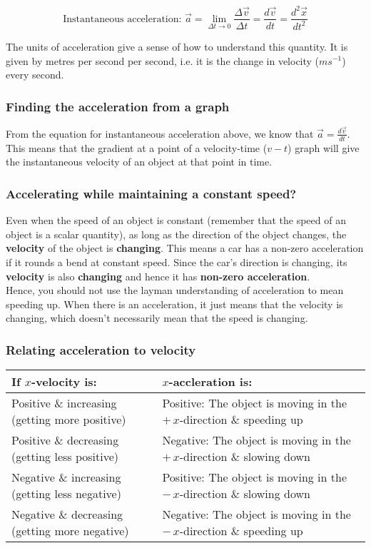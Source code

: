 \documentclass[11pt]{article}
\begin{document}
\[\text{Instantaneous acceleration: } \vec{a} = \lim_{\Delta t \rightarrow 0} \frac{\Delta \vec{v}}{\Delta t} = \frac{d \vec{v}}{dt} = \frac{d^2 \vec{x}}{dt^2}\]

The units of acceleration give a sense of how to understand this quantity. It is given by metres per second per second, i.e. it is the change in velocity (\(\si{ms^{-1}}\)) every second.

\subsubsection{Finding the acceleration from a graph}
\label{sec:org63b3367}
From the equation for instantaneous acceleration above, we know that \(\vec{a} = \frac{d \vec{v}}{dt}\). This means that the gradient at a point of a velocity-time (\(v - t\)) graph will give the instantaneous velocity of an object at that point in time.

\subsubsection{Accelerating while maintaining a constant speed?}
\label{sec:orga23889c}
Even when the speed of an object is constant (remember that the speed of an object is a scalar quantity), as long as the direction of the object changes, the \textbf{velocity} of the object is \textbf{changing}. This means a car has a non-zero acceleration if it rounds a bend at constant speed. Since the car's direction is changing, its \textbf{velocity} is also \textbf{changing} and hence it has \textbf{non-zero acceleration}.
\\[0pt]

Hence, you should not use the layman understanding of acceleration to mean speeding up. When there is an acceleration, it just means that the velocity is changing, which doesn't necessarily mean that the speed is changing.


\subsubsection{Relating acceleration to velocity}
\label{sec:org6d8c582}

\begin{center}
\begin{tabular}{ |m{11em}|m{11em}| }
\hline
If $x$-velocity is: & $x$-accleration is: \\
\hline
Positive \& increasing (getting more positive) & Positive: The object is moving in the $+ \, x$-direction \& speeding up \\
\hline
Positive \& decreasing (getting less positive) & Negative: The object is moving in the $+ \, x$-direction \& slowing down \\
\hline
Negative \& increasing (getting less negative) & Positive: The object is moving in the $- \, x$-direction \& slowing down \\
\hline
Negative \& decreasing (getting more negative) & Negative: The object is moving in the $- \, x$-direction \& speeding up \\
\hline
\end{tabular}
\end{center}
\end{document}
